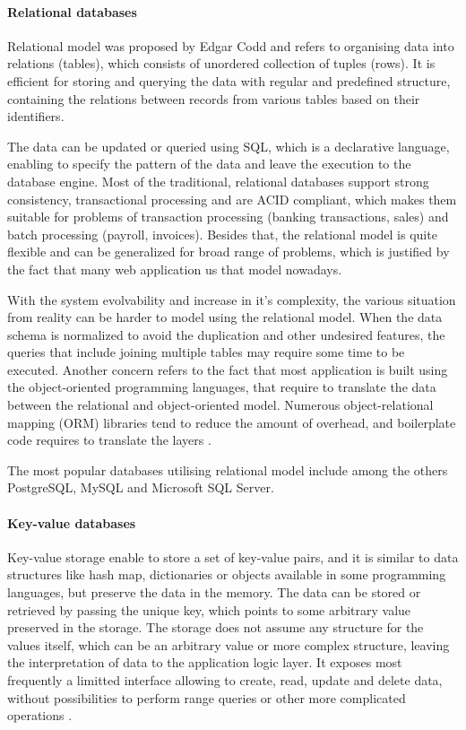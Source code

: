 \paragraph*{Relational databases}

Relational model was proposed by Edgar Codd and refers to organising data into relations (tables), which consists of unordered collection of tuples (rows). It is efficient for storing and querying the data with regular and predefined structure, containing the relations between records from various tables based on their identifiers.

The data can be updated or queried using SQL, which is a declarative language, enabling to specify the pattern of the data and leave the execution to the database engine. Most of the traditional, relational databases support strong consistency, transactional processing and are ACID compliant, which makes them suitable for problems of transaction processing (banking transactions, sales) and batch processing (payroll, invoices). Besides that, the relational model is quite flexible and can be generalized for broad range of problems, which is justified by the fact that many web application us that model nowadays.

With the system evolvability and increase in it's complexity, the various situation from reality can be harder to model using the relational model. When the data schema is normalized to avoid the duplication and other undesired features, the queries that include joining multiple tables may require some time to be executed. Another concern refers to the fact that most application is built using the object-oriented programming languages, that require to translate the data between the relational and object-oriented model. Numerous object-relational mapping (ORM) libraries tend to reduce the amount of overhead, and boilerplate code requires to translate the layers \cite{DesignDataIntensiveApplications}.

The most popular databases utilising relational model include among the others PostgreSQL, MySQL and Microsoft SQL Server.

\paragraph*{Key-value databases}

Key-value storage enable to store a set of key-value pairs, and it is similar to data structures like hash map, dictionaries or objects available in some programming languages, but preserve the data in the memory. The data can be stored or retrieved by passing the unique key, which points to some arbitrary value preserved in the storage.
The storage does not assume any structure for the values itself, which can be an arbitrary value or more complex structure, leaving the interpretation of data to the application logic layer.
It exposes most frequently a limitted interface allowing to create, read, update and delete data, without possibilities to perform range queries or other more complicated operations \cite{NoSQLDatabaseSystemsSurveyDecisionGuidance}.

